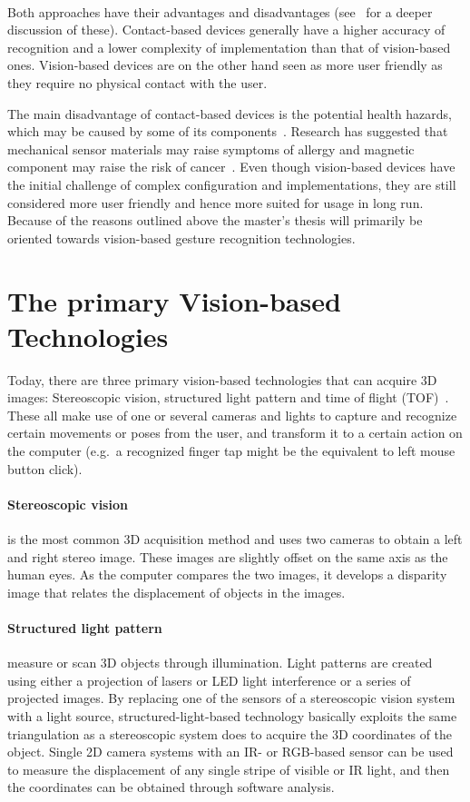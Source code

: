 \paragraph{}Both approaches have their advantages and disadvantages (see~\citet{Rautaray2015} for a deeper discussion of these). Contact-based devices generally have a higher accuracy of recognition and a lower complexity of implementation than that of vision-based ones. Vision-based devices are on the other hand seen as more user friendly as they require no physical contact with the user. 

The main disadvantage of contact-based devices is the potential health hazards, which may be caused by some of its components~\citep{Schultz2003}. Research has suggested that mechanical sensor materials may raise symptoms of allergy and magnetic component may raise the risk of cancer~\citep{Nishikawa2003}. Even though vision-based devices have the initial challenge of complex configuration and implementations, they are still considered more user friendly and hence more suited for usage in long run. Because of the reasons outlined above the master's thesis will primarily be oriented towards vision-based gesture recognition technologies. 

\section{The primary Vision-based Technologies}
Today, there are three primary vision-based technologies that can acquire 3D images: Stereoscopic vision, structured light pattern and time of flight (TOF)~\citep{Ko2012}.
These all make use of one or several cameras and lights to capture and recognize certain movements or poses from the user, and transform it to a certain action on the computer (e.g.~a recognized finger tap might be the equivalent to left mouse button click). 

\paragraph{Stereoscopic vision}is the most common 3D acquisition method and uses two cameras to obtain a left and right stereo image. These images are slightly offset on the same axis as the human eyes. As the computer compares the two images, it develops a disparity image that relates the displacement of objects in the images.

\paragraph{Structured light pattern}measure or scan 3D objects through illumination. Light patterns are created using either a projection of lasers or LED light interference or a series of projected images. By
replacing one of the sensors of a stereoscopic vision system with a light source, structured-light-based technology basically exploits the same triangulation as a stereoscopic system does to acquire the 3D coordinates of the object. Single 2D camera systems with an IR- or RGB-based sensor can be used to measure the displacement of any single stripe of visible or IR light, and then the coordinates can be obtained through software analysis.

